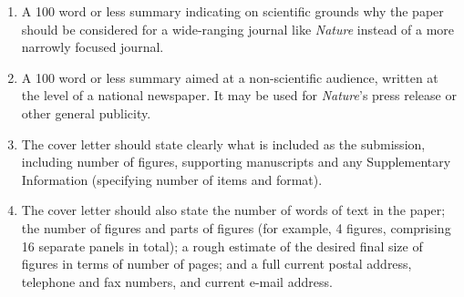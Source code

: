 \documentclass[a4paper, twocolumn]{article}
\begin{document}
\begin{enumerate}
 \item A 100 word or less summary indicating on scientific grounds
why the paper should be considered for a wide-ranging journal like
\textsl{Nature} instead of a more narrowly focused journal.
 \item A 100 word or less summary aimed at a non-scientific audience,
written at the level of a national newspaper.  It may be used for
\textsl{Nature}'s press release or other general publicity.
 \item The cover letter should state clearly what is included as the
submission, including number of figures, supporting manuscripts
and any Supplementary Information (specifying number of items and
format).
 \item The cover letter should also state the number of
words of text in the paper; the number of figures and parts of
figures (for example, 4 figures, comprising 16 separate panels in
total); a rough estimate of the desired final size of figures in
terms of number of pages; and a full current postal address,
telephone and fax numbers, and current e-mail address.
\end{enumerate}
\end{document}
